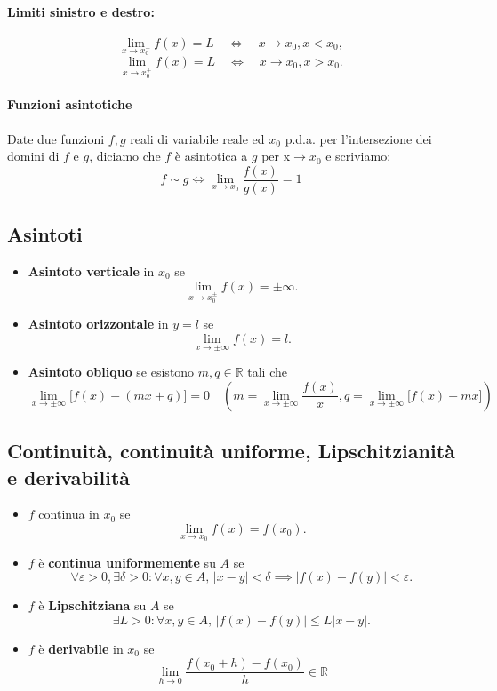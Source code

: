 \documentclass[12pt,a4paper]{article}
\begin{document}
\paragraph{Limiti sinistro e destro:}
\[
\lim_{x \to x_0^-} f(x) = L \quad \Longleftrightarrow \quad x \to x_0, x < x_0,
\]
\[
\lim_{x \to x_0^+} f(x) = L \quad \Longleftrightarrow \quad x \to x_0, x > x_0.
\]

\paragraph{Funzioni asintotiche}
Date due funzioni $f,g$ reali di variabile reale ed $x_0$ p.d.a. per l'intersezione dei domini di $f$ e $g$, diciamo che $f$ è asintotica a $g$ per x$\to x_0$ e scriviamo:
\[f\sim g\iff\lim_{x \to x_0} \frac{f(x)}{g(x)} = 1\]
\subsection*{Asintoti}
\begin{itemize}
    \item \textbf{Asintoto verticale} in \( x_0 \) se  
    \[
    \lim_{x \to x_0^{\pm}} f(x) = \pm \infty.
    \]
    \item \textbf{Asintoto orizzontale} in \( y = l \) se  
    \[
    \lim_{x \to \pm \infty} f(x) = l.
    \]
    \item \textbf{Asintoto obliquo} se esistono \( m, q \in \mathbb{R} \) tali che  
    \[
    \lim_{x \to \pm \infty} \bigl[f(x) - (mx + q)\bigr] = 0 \quad(m = \lim_{x \to \pm \infty} \frac{f(x)}{x},q = \lim_{x \to \pm \infty} \bigl[f(x) - mx \bigr])
    \]
\end{itemize}

\subsection*{Continuità, continuità uniforme, Lipschitzianità e derivabilità}

\begin{itemize}
    \item \( f \) continua in \( x_0 \) se  
    \[
    \lim_{x \to x_0} f(x) = f(x_0).
    \]
    \item \( f \) è \textbf{continua uniformemente} su \( A \) se  
    \[
    \forall \varepsilon > 0, \exists \delta > 0 : \forall x,y \in A,\, |x - y| < \delta \implies |f(x) - f(y)| < \varepsilon.
    \]
    \item \( f \) è \textbf{Lipschitziana} su \( A \) se  
    \[
    \exists L > 0 : \forall x, y \in A,\, |f(x) - f(y)| \leq L |x - y|.
    \]
    \item \( f \) è \textbf{derivabile} in \( x_0 \) se  
    \[
    \lim_{h \to 0} \frac{f(x_0 + h) - f(x_0)}{h}\in\mathbb{R}
    \]
\end{itemize}
\end{document}
